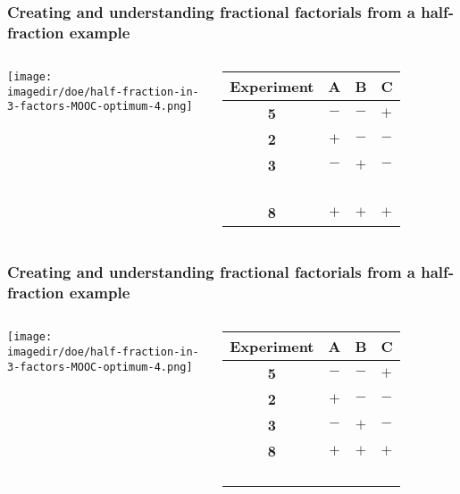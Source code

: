 \documentclass[handout,11pt,aspectratio=169,mathserif]{beamer}
\begin{document}
\begin{frame}\frametitle{{\large Creating and understanding fractional factorials from a half-fraction example}}
	\begin{columns}
			\begin{center}
				\texttt{[image: \\imagedir/doe/half-fraction-in-3-factors-MOOC-optimum-4.png]}
			\end{center}

			\begin{tabulary}{\linewidth}{cccl}\hline 
				\textsf{\relax Experiment } & \textbf{\relax A } & \textbf{\relax B } & \textbf{\relax C } \\
				\hline 
				\color{myOrange} \textbf{5} & \(-\) & \(-\) & \(+\) \\
				\color{myOrange} \textbf{2} & \(+\) & \(-\) & \(-\) \\
				\color{myOrange} \textbf{3} & \(-\) & \(+\) & \(-\) \\
				 & & & \\
				 & & & \\
				 & & & \\
				 & & & \\
				\color{myOrange} \textbf{8} & \(+\) & \(+\) & \(+\) \\  \hline
			\end{tabulary}
	\end{columns}	
\end{frame}

\begin{frame}\frametitle{{\large Creating and understanding fractional factorials from a half-fraction example}}
	\begin{columns}
		\column{0.65\textwidth}
			\begin{center}
				\texttt{[image: \\imagedir/doe/half-fraction-in-3-factors-MOOC-optimum-4.png]}
			\end{center}

		\column{0.55\textwidth}
			\begin{tabulary}{\linewidth}{cccl}\hline 
				\textsf{\relax Experiment } & \textbf{\relax A } & \textbf{\relax B } & \textbf{\relax C } \\
				\hline 
				 \color{myOrange} \textbf{5} & \(-\) & \(-\) & \(+\) \\
				 \color{myOrange} \textbf{2} & \(+\) & \(-\) & \(-\) \\
				 \color{myOrange} \textbf{3} & \(-\) & \(+\) & \(-\) \\
				 \color{myOrange} \textbf{8} & \(+\) & \(+\) & \(+\) \\ \hline
				  & & & \\
				  & & & \\
				  & & & \\
				  & & & 
			\end{tabulary}
	\end{columns}	
\end{frame}
\end{document}
